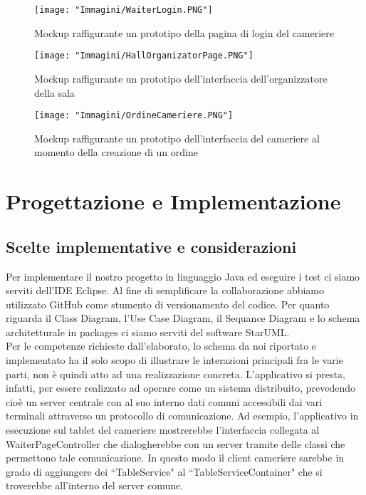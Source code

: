 \documentclass{article}
\begin{document}
\newpage

\begin{figure}[!h]
\centering
\texttt{[image: "Immagini/WaiterLogin.PNG"]}
\caption{Mockup raffigurante un prototipo della pagina di login del cameriere}
\end{figure}

\begin{figure}[!h]
\centering
\texttt{[image: "Immagini/HallOrganizatorPage.PNG"]}
\caption{Mockup raffigurante un prototipo dell'interfaccia dell'organizzatore della sala}
\end{figure}

\newpage

\begin{figure}[!h]
\centering
\texttt{[image: "Immagini/OrdineCameriere.PNG"]}
\caption{Mockup raffigurante un prototipo dell'interfaccia del cameriere al momento della creazione di un ordine}
\end{figure}

\section{Progettazione e Implementazione}
\subsection{Scelte implementative e considerazioni}
Per implementare il nostro progetto in linguaggio Java ed eseguire i test ci siamo serviti dell'IDE Eclipse. Al fine di semplificare la collaborazione abbiamo utilizzato GitHub come stumento di versionamento del codice. Per quanto riguarda il Class Diagram, l'Use Case Diagram, il Sequance Diagram e lo schema architetturale in packages ci siamo serviti del software StarUML. \\
Per le competenze richieste dall'elaborato, lo schema da noi riportato e implementato ha il solo scopo di illustrare le interazioni principali fra le varie parti, non \`e quindi atto ad una realizzazione concreta. L'applicativo si presta, infatti, per essere realizzato ad operare come un sistema distribuito, prevedendo cio\`e un server centrale con al suo interno dati comuni accessibili dai vari terminali attraverso un protocollo di comunicazione.
Ad esempio, l'applicativo in esecuzione sul tablet del cameriere mostrerebbe l'interfaccia collegata al WaiterPageController che dialogherebbe con un server tramite delle classi che permettono tale comunicazione. In questo modo il client cameriere sarebbe in grado di aggiungere dei ``TableService" al ``TableServiceContainer" che si troverebbe all'interno del server comune.  
\end{document}
